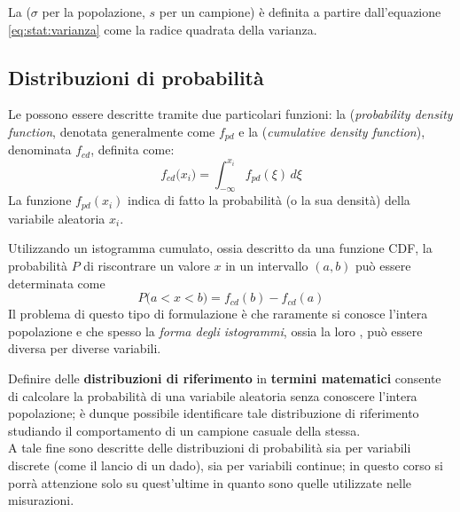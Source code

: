 		La  ($\sigma$ per la popolazione, $s$ per un campione) è definita a partire dall'equazione \ref{eq:stat:varianza} come la radice quadrata della varianza.
		
	\subsection{Distribuzioni di probabilità}
		Le  possono essere descritte tramite due particolari funzioni: la  (\textit{probability density function}, denotata generalmente come $f_{pd}$ e la  (\textit{cumulative density function}), denominata $f_{cd}$, definita come:
		\begin{equation}
			f_{cd} \big(x_i\big) = \int_{-\infty}^{x_i} f_{pd}(\xi)\, d\xi
		\end{equation}
		La funzione $f_{pd}(x_i)$ indica di fatto la probabilità (o la sua densità) della variabile aleatoria $x_i$.
		
		Utilizzando un istogramma cumulato, ossia descritto da una funzione CDF, la probabilità $P$ di riscontrare un valore $x$ in un intervallo $(a,b)$ può essere determinata come
		\[ P\big(a< x < b\big) = f_{cd}(b) - f_{cd}(a) \]
		Il problema di questo tipo di formulazione è che raramente si conosce l'intera popolazione e che spesso la \textit{forma degli istogrammi}, ossia la loro , può essere diversa per diverse variabili.
		
		\vspace{3mm} Definire delle \textbf{distribuzioni di riferimento} in \textbf{termini matematici} consente di calcolare la probabilità di una variabile aleatoria senza conoscere l'intera popolazione; è dunque possibile identificare tale distribuzione di riferimento studiando il comportamento di un campione casuale della stessa. \\ 
		A tale fine sono descritte delle distribuzioni di probabilità sia per variabili discrete (come il lancio di un dado), sia per variabili continue; in questo corso si porrà attenzione solo su quest'ultime in quanto sono quelle utilizzate nelle misurazioni.
	
